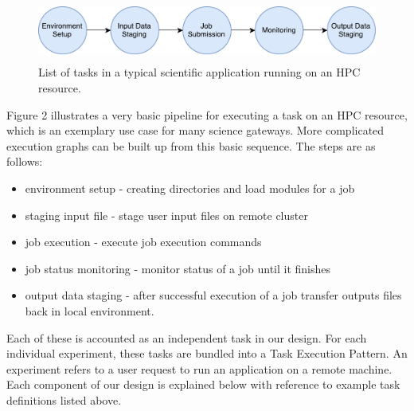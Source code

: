 \documentclass[review]{elsarticle}
\begin{document}
\begin{figure}
\centering
\includegraphics[height=0.8in, width=4.8 in]{figures/figure2.pdf}
\caption{List of tasks in a typical scientific application running on an HPC resource.}
\end{figure}

Figure 2 illustrates a very basic pipeline for executing a task on an HPC resource, which is an exemplary use case for many science gateways.  More complicated execution graphs can be built up from this basic sequence. The steps are as follows:
\begin{itemize}
\item environment setup - creating directories and load modules for a job
\item staging input file - stage user input files on remote cluster
\item job execution - execute job execution commands
\item job status monitoring - monitor status of a job until it finishes
\item output data staging - after successful execution of a job transfer outputs files back in local environment.
\end{itemize}
Each of these is accounted as an independent task in our design. For each individual experiment, these tasks are bundled into a Task Execution Pattern. An experiment refers to a user request to run an application on a remote machine. Each component of our design is explained below with reference to example task definitions listed above.
\end{document}
